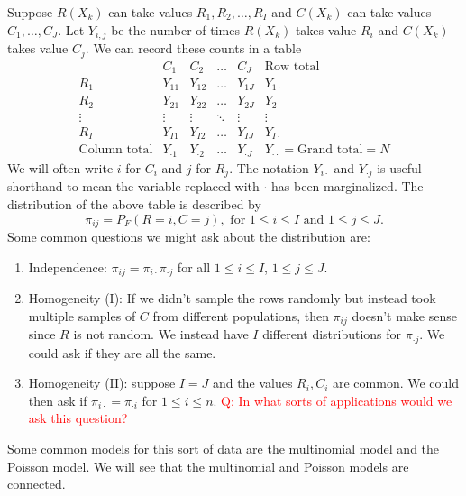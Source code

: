Suppose $R(X_k)$ can take values $R_1,R_2,\ldots,R_I$ and $C(X_k)$ can take values $C_1,\ldots,C_J$. Let $Y_{i,j}$ be the number of times $R(X_k)$ takes value $R_i$ and $C(X_k)$ takes value  $C_j$. We can record these counts in a table
\[\begin{array}{c|cccc|c}
    &C_1&C_2&\ldots&C_J&\text{Row total}\\
    \hline
R_1 &Y_{11}&Y_{12}&\ldots&Y_{1J}&Y_{1\cdot}\\
R_2&Y_{21}&Y_{22}&\ldots&Y_{2J}&Y_{2\cdot}\\
\vdots&\vdots&\vdots&\ddots&\vdots&\vdots \\
R_I&Y_{I1}&Y_{I2}&\ldots&Y_{IJ}&Y_{I\cdot}\\
\hline 
\text{Column total}& Y_{\cdot 1}&Y_{\cdot 2}&\ldots &Y_{\cdot J} & Y_{\cdot\cdot}=\text{Grand total}=N
\end{array} \]
We will often write $i$ for $C_i$ and $j$ for $R_j$. The notation $Y_{i\cdot}$ and $Y_{\cdot j}$ is useful shorthand to mean the variable replaced with $\cdot$ has been marginalized. The distribution of the above table is described by 
\[\pi_{ij} = P_F(R=i, C=j), \text{ for } 1 \le i \le I \text{ and } 1 \le j \le J. \]
Some common questions we might ask about the distribution are:
\begin{enumerate}
    \item Independence: $\pi_{ij} = \pi_{i \cdot}\pi_{\cdot j}$ for all $1 \le i \le I$, $1 \le j \le J$.
    \item Homogeneity (I): If we didn't sample the rows randomly but instead took multiple samples of $C$ from different populations, then $\pi_{ij}$ doesn't make sense since $R$ is not random. We instead have $I$ different distributions for $\pi_{\cdot j}$. We could ask if they are all the same.
    \item Homogeneity (II): suppose $I=J$ and the values $R_i,C_i$ are common. We could then ask if $\pi_{i \cdot} = \pi_{\cdot i}$ for $1 \le i \le n$. \textcolor{red}{Q: In what sorts of applications would we ask this question?}
\end{enumerate}
Some common models for this sort of data are the multinomial model and the Poisson model. We will see that the multinomial and Poisson models are connected.
